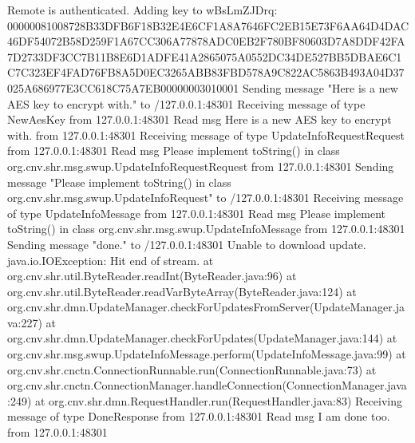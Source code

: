 \documentclass{article}
\begin{document}
Remote is authenticated.
Adding key to wBsLmZJDrq: 00000081008728B33DFB6F18B32E4E6CF1A8A7646FC2EB15E73F6AA64D4DAC46DF54072B58D259F1A67CC306A77878ADC0EB2F780BF80603D7A8DDF42FA7D2733DF3CC7B11B8E6D1ADFE41A2865075A0552DC34DE527BB5DBAE6C1C7C323EF4FAD76FB8A5D0EC3265ABB83FBD578A9C822AC5863B493A04D37025A686977E3CC618C75A7EB00000003010001
Sending message "Here is a new AES key to encrypt with." to /127.0.0.1:48301
Receiving message of type NewAesKey from 127.0.0.1:48301
Read msg Here is a new AES key to encrypt with. from 127.0.0.1:48301
Receiving message of type UpdateInfoRequestRequest from 127.0.0.1:48301
Read msg Please implement toString() in class org.cnv.shr.msg.swup.UpdateInfoRequestRequest from 127.0.0.1:48301
Sending message "Please implement toString() in class org.cnv.shr.msg.swup.UpdateInfoRequest" to /127.0.0.1:48301
Receiving message of type UpdateInfoMessage from 127.0.0.1:48301
Read msg Please implement toString() in class org.cnv.shr.msg.swup.UpdateInfoMessage from 127.0.0.1:48301
Sending message "done." to /127.0.0.1:48301
Unable to download update.
java.io.IOException: Hit end of stream.
	at org.cnv.shr.util.ByteReader.readInt(ByteReader.java:96)
	at org.cnv.shr.util.ByteReader.readVarByteArray(ByteReader.java:124)
	at org.cnv.shr.dmn.UpdateManager.checkForUpdatesFromServer(UpdateManager.java:227)
	at org.cnv.shr.dmn.UpdateManager.checkForUpdates(UpdateManager.java:144)
	at org.cnv.shr.msg.swup.UpdateInfoMessage.perform(UpdateInfoMessage.java:99)
	at org.cnv.shr.cnctn.ConnectionRunnable.run(ConnectionRunnable.java:73)
	at org.cnv.shr.cnctn.ConnectionManager.handleConnection(ConnectionManager.java:249)
	at org.cnv.shr.dmn.RequestHandler.run(RequestHandler.java:83)
Receiving message of type DoneResponse from 127.0.0.1:48301
Read msg I am done too. from 127.0.0.1:48301
\end{document}
